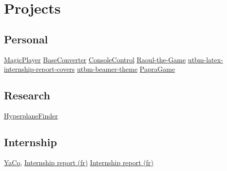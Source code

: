 \documentclass[10pt,a4paper,sans]{moderncv}
\begin{document}

	\vspace*{\deletedSpace}
	\section{Projects}
		\subsection{Personal}
				{\href{https://github.com/pinam45/MagicPlayer}{MagicPlayer}}
				{\href{https://github.com/pinam45/BaseConverter}{BaseConverter}}
				{\href{https://github.com/pinam45/ConsoleControl}{ConsoleControl}}
				{\href{https://github.com/TiWinDeTea/Raoul-the-Game}{Raoul-the-Game}}
				{\href{https://github.com/pinam45/utbm-latex-internship-report-covers}{utbm-latex-internship-report-covers}}
				{\href{https://github.com/pinam45/utbm-beamer-theme}{utbm-beamer-theme}}
				{\href{https://github.com/TiWinDeTea/PapraGame}{PapraGame}}
		\subsection{Research}
				{\href{https://github.com/Lomadriel/HyperplaneFinder}{HyperplaneFinder}}
		\subsection{Internship}
				{\href{https://github.com/DGA-MI-SSI/YaCo}{YaCo}, \href{https://github.com/pinam45/UTBM_ST40_Rapport_de_stage_DGA}{Internship report (fr)}}
				{\href{https://github.com/pinam45/UTBM_ST40_Rapport_de_stage_DGA}{Internship report (fr)}}
\end{document}
